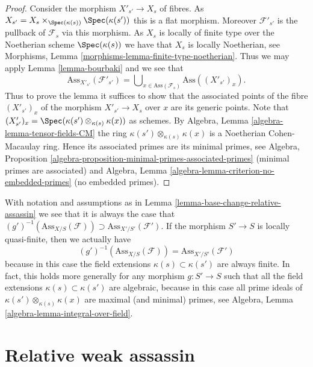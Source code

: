 \begin{proof}
Consider the morphism $X'_{s'} \to X_s$ of fibres. As
$X_{s'} = X_s \times_{\Spec(\kappa(s))} \Spec(\kappa(s'))$
this is a flat morphism. Moreover $\mathcal{F}'_{s'}$ is the pullback
of $\mathcal{F}_s$ via this morphism. As $X_s$ is locally of finite
type over the Noetherian scheme $\Spec(\kappa(s))$ we have that
$X_s$ is locally Noetherian, see
Morphisms, Lemma \ref{morphisms-lemma-finite-type-noetherian}.
Thus we may apply
Lemma \ref{lemma-bourbaki}
and we see that
$$
\text{Ass}_{X'_{s'}}(\mathcal{F}'_{s'}) =
\bigcup\nolimits_{x \in \text{Ass}(\mathcal{F}_s)} \text{Ass}((X'_{s'})_x).
$$
Thus to prove the lemma it suffices to show that the associated points
of the fibre $(X'_{s'})_x$ of the morphism $X'_{s'} \to X_s$ over $x$
are its generic points. Note that
$(X'_{s'})_x = \Spec(\kappa(s') \otimes_{\kappa(s)} \kappa(x))$
as schemes. By
Algebra, Lemma \ref{algebra-lemma-tensor-fields-CM}
the ring $\kappa(s') \otimes_{\kappa(s)} \kappa(x)$ is a Noetherian
Cohen-Macaulay ring. Hence its associated primes are its minimal primes, see
Algebra, Proposition \ref{algebra-proposition-minimal-primes-associated-primes}
(minimal primes are associated) and
Algebra, Lemma \ref{algebra-lemma-criterion-no-embedded-primes}
(no embedded primes).
\end{proof}

\begin{remark}
\label{remark-base-change-relative-assassin}
With notation and assumptions as in
Lemma \ref{lemma-base-change-relative-assassin}
we see that it is always the case that
$(g')^{-1}(\text{Ass}_{X/S}(\mathcal{F})) \supset
\text{Ass}_{X'/S'}(\mathcal{F}')$.
If the morphism $S' \to S$ is locally quasi-finite, then we actually have
$$
(g')^{-1}(\text{Ass}_{X/S}(\mathcal{F}))
=
\text{Ass}_{X'/S'}(\mathcal{F}')
$$
because in this case the field extensions $\kappa(s) \subset \kappa(s')$
are always finite. In fact, this holds more generally for any morphism
$g : S' \to S$ such that all the field extensions
$\kappa(s) \subset \kappa(s')$ are algebraic, because in this case all
prime ideals of $\kappa(s') \otimes_{\kappa(s)} \kappa(x)$ are
maximal (and minimal) primes, see
Algebra, Lemma \ref{algebra-lemma-integral-over-field}.
\end{remark}




\section{Relative weak assassin}
\label{section-relative-weak-assassin}

